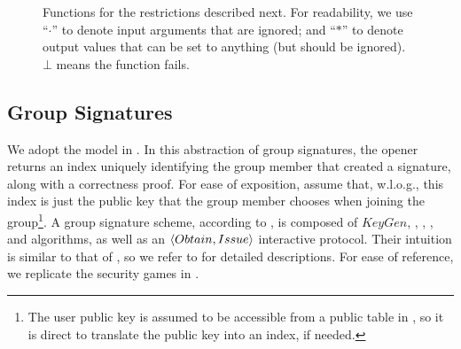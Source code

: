 \begin{figure}[ht!]
  \caption{Functions for the \CUASGen restrictions described next.
    For readability, we use ``$\cdot$'' to denote input arguments that are
    ignored; and ``$\ast$'' to denote output values that can be set to anything
    (but should be ignored). $\bot$ means the function fails.}
  \label{fig:func-restrictions}
\end{figure}

\subsection{Group Signatures}
\label{ssec:related-models-gs}

We adopt the model in \cite{bsz05}. In this abstraction
of group signatures, the opener returns an index uniquely identifying the group
member that created a signature, along with a correctness proof. For ease of
exposition, assume that, w.l.o.g., this index is just the public key that the
group member chooses when joining the group\footnote{The user public key is
  assumed to be accessible from a public table in \cite{bsz05}, so it is direct
  to translate the public key into an index, if needed.}. A group signature
scheme, according to \cite{bsz05}, is composed of $KeyGen$, \UKeyGen, \Sign,
\Verify, \Open and \Judge algorithms, as well as an $\langle Obtain,Issue
\rangle$ interactive protocol. Their intuition is similar to that of
\UAS, so we refer to \cite{bsz05} for detailed descriptions. For ease of
reference, we replicate the security games in .

